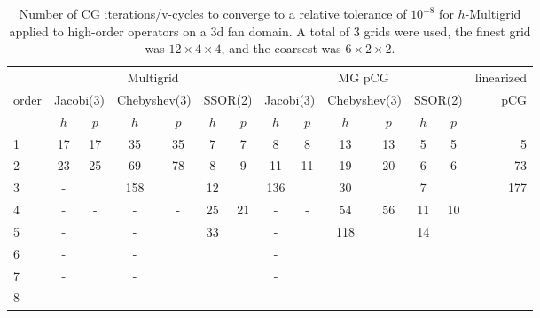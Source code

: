 \begin{table}
  \caption{\label{tab:fan3} Number of CG iterations/v-cycles to converge to a relative tolerance of $10^{-8}$ for $h$-Multigrid applied to high-order operators on a 3d fan domain. A total of 3 grids were used, the finest grid was $12\times 4\times 4$, and the coarsest was $6\times 2\times 2$.}
		\centering
    \begin{tabular}{|l|c|c|c|c|c|c|c|c|c|c|c|c|r|} 
	    \hline
						        & \multicolumn{6}{c|}{Multigrid} & \multicolumn{6}{c|}{MG pCG} &          linearized \\
																 \cline{2-13}
									order &  \multicolumn{2}{c|}{\scriptsize  Jacobi(3)} &  \multicolumn{2}{c|}{\scriptsize Chebyshev(3)} & \multicolumn{2}{c|}{\scriptsize  SSOR(2)} & \multicolumn{2}{c|}{\scriptsize Jacobi(3)} &  \multicolumn{2}{c|}{\scriptsize Chebyshev(3)} & \multicolumn{2}{c|}{\scriptsize SSOR(2)} & pCG\\
						\hline
						 & $h$ & $p$ & $h$ & $p$& $h$ & $p$& $h$ & $p$& $h$ & $p$& $h$ & $p$& \\
						 \cline{2-13}
						 
1 &  17  & 17 &  35  & 35  & 7   &  7  & 8   &  8  & 13  & 13  & 5  &  5   &   5 \\
2 &  23  & 25 &  69  & 78  & 8   &  9  & 11  &  11 & 19  & 20  & 6  &  6   &  73 \\  
3 &  -   &    &  158 &     & 12  &     & 136 &     & 30  &     & 7  &      & 177 \\
4 &  -   & -  &   -  &  -  & 25  & 21  &  -  &  -  & 54  & 56  & 11 & 10   &     \\
5 &  -   &    &   -  &     & 33  &     &  -  &     & 118 &     & 14 &      &     \\ 
6 &  -   &    &   -  &     &     &     &  -  &     &     &     &    &      &     \\ 
7 &  -   &    &   -  &     &     &     &  -  &     &     &     &    &      &     \\ 
8 &  -   &    &   -  &     &     &     &  -  &     &     &     &    &      &     \\ 
			\hline
	  \end{tabular}
\end{table}
% 
